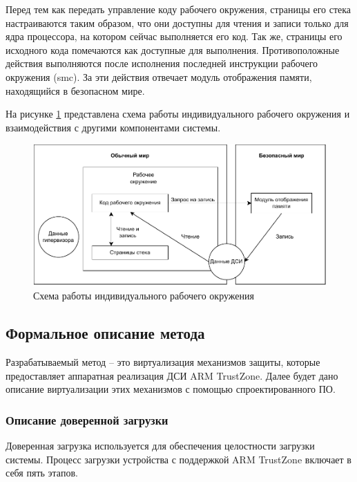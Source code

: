 Перед тем как передать управление коду рабочего окружения, страницы его стека настраиваются таким образом, что они доступны для чтения и записи только для ядра процессора, на котором сейчас выполняется его код. Так же, страницы его исходного кода помечаются как доступные для выполнения. Противоположные действия выполняются после исполнения последней инструкции рабочего окружения (smc). За эти действия отвечает модуль отображения памяти, находящийся в безопасном мире.

На рисунке \ref{fig:ciee} представлена схема работы индивидуального рабочего окружения и взаимодействия с другими компонентами системы.

\begin{figure}[h]
	\centering
	\includegraphics[width=\textwidth]{img/ciee.pdf}
	\caption{Схема работы индивидуального рабочего окружения}
	\label{fig:ciee}
\end{figure}

\subsection{Формальное описание метода}

Разрабатываемый метод -- это виртуализация механизмов защиты, которые предоставляет аппаратная реализация ДСИ ARM TrustZone. Далее будет дано описание виртуализации этих механизмов с помощью спроектированного ПО.

\subsubsection{Описание доверенной загрузки}

Доверенная загрузка используется для обеспечения целостности загрузки системы. Процесс загрузки устройства с поддержкой ARM TrustZone включает в себя пять этапов.

